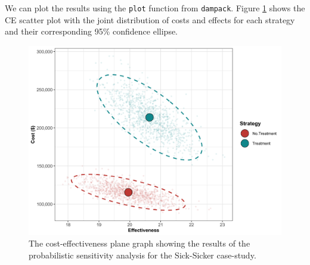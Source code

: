 \documentclass[]{book}
\newenvironment{Shaded}{\begin{snugshade}}{\end{snugshade}}
\newcommand{\KeywordTok}[1]{\textcolor[rgb]{0.13,0.29,0.53}{\textbf{#1}}}
\newcommand{\DataTypeTok}[1]{\textcolor[rgb]{0.13,0.29,0.53}{#1}}
\newcommand{\DecValTok}[1]{\textcolor[rgb]{0.00,0.00,0.81}{#1}}
\newcommand{\CharTok}[1]{\textcolor[rgb]{0.31,0.60,0.02}{#1}}
\newcommand{\StringTok}[1]{\textcolor[rgb]{0.31,0.60,0.02}{#1}}
\newcommand{\CommentTok}[1]{\textcolor[rgb]{0.56,0.35,0.01}{\textit{#1}}}
\newcommand{\ControlFlowTok}[1]{\textcolor[rgb]{0.13,0.29,0.53}{\textbf{#1}}}
\newcommand{\OperatorTok}[1]{\textcolor[rgb]{0.81,0.36,0.00}{\textbf{#1}}}
\newcommand{\NormalTok}[1]{#1}
\begin{document}
\begin{Shaded}
\end{Shaded}

We can plot the results using the \texttt{plot} function from
\texttt{dampack}. Figure \ref{fig:05b-CEAplane} shows the CE scatter
plot with the joint distribution of costs and effects for each strategy
and their corresponding 95\% confidence ellipse.

\begin{figure}

{\centering \includegraphics[width=33.33in]{../figs/05b_cea_plane_scatter} 

}

\caption{The cost-effectiveness plane graph showing the results of the probabilistic sensitivity analysis for the Sick-Sicker case-study.}\label{fig:05b-CEAplane}
\end{figure}
\end{document}
